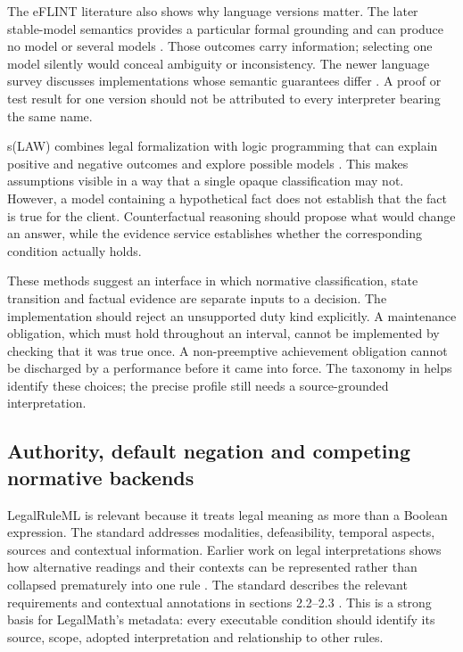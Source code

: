 
The eFLINT literature also shows why language versions matter. The later
stable-model semantics provides a particular formal grounding and can produce
no model or several models \citep[translation and evaluation sections]{eflintstable2025}.
Those outcomes carry information; selecting one model silently would conceal
ambiguity or inconsistency. The newer language survey discusses implementations
whose semantic guarantees differ \citep{eflint2026}. A proof or test result for
one version should not be attributed to every interpreter bearing the same name.

s(LAW) combines legal formalization with logic programming that can explain
positive and negative outcomes and explore possible models
\citep[secs.~2--5]{slaw2024}. This makes assumptions visible in a way that a
single opaque classification may not. However, a model containing a hypothetical
fact does not establish that the fact is true for the client. Counterfactual
reasoning should propose what would change an answer, while the evidence
service establishes whether the corresponding condition actually holds.

These methods suggest an interface in which normative classification,
state transition and factual evidence are separate inputs to a decision. The
implementation should reject an unsupported duty kind explicitly. A maintenance
obligation, which must hold throughout an interval, cannot be implemented by
checking that it was true once. A non-preemptive achievement obligation cannot
be discharged by a performance before it came into force. The taxonomy in
\citet[sec.~3]{normative2016} helps identify these choices; the precise profile
still needs a source-grounded interpretation.

\subsection{Authority, default negation and competing normative backends}
\label{merge:P-02-literature:04}


LegalRuleML is relevant because it treats legal meaning as more than a Boolean
expression. The standard addresses modalities, defeasibility, temporal aspects,
sources and contextual information. Earlier work on legal interpretations shows
how alternative readings and their contexts can be represented rather than
collapsed prematurely into one rule
\citep[sec.~4]{legalinterpretations2014}. The standard describes the relevant
requirements and contextual annotations in sections 2.2--2.3
\citep{legalruleml2021}. This is a strong basis
for LegalMath's metadata: every executable condition should identify its source,
scope, adopted interpretation and relationship to other rules.

